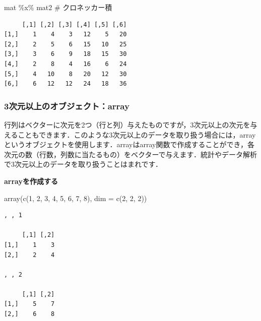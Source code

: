 \documentclass[
  letterpaper,
  DIV=11,
  numbers=noendperiod]{scrreprt}
\newenvironment{Shaded}{\begin{snugshade}}{\end{snugshade}}
\newcommand{\AttributeTok}[1]{\textcolor[rgb]{0.40,0.45,0.13}{#1}}
\newcommand{\CommentTok}[1]{\textcolor[rgb]{0.37,0.37,0.37}{#1}}
\newcommand{\DecValTok}[1]{\textcolor[rgb]{0.68,0.00,0.00}{#1}}
\newcommand{\FunctionTok}[1]{\textcolor[rgb]{0.28,0.35,0.67}{#1}}
\newcommand{\NormalTok}[1]{\textcolor[rgb]{0.00,0.23,0.31}{#1}}
\newcommand{\SpecialCharTok}[1]{\textcolor[rgb]{0.37,0.37,0.37}{#1}}
\begin{document}
\begin{Shaded}
\begin{Highlighting}[]
\NormalTok{mat }\SpecialCharTok{\%x\%}\NormalTok{ mat2 }\CommentTok{\# クロネッカー積}
\end{Highlighting}
\end{Shaded}

\begin{verbatim}
     [,1] [,2] [,3] [,4] [,5] [,6]
[1,]    1    4    3   12    5   20
[2,]    2    5    6   15   10   25
[3,]    3    6    9   18   15   30
[4,]    2    8    4   16    6   24
[5,]    4   10    8   20   12   30
[6,]    6   12   12   24   18   36
\end{verbatim}

\hypertarget{ux6b21ux5143ux4ee5ux4e0aux306eux30aaux30d6ux30b8ux30a7ux30afux30c8array}{%
\subsubsection{3次元以上のオブジェクト：array}\label{ux6b21ux5143ux4ee5ux4e0aux306eux30aaux30d6ux30b8ux30a7ux30afux30c8array}}

行列はベクターに次元を2つ（行と列）与えたものですが，3次元以上の次元を与えることもできます．このような3次元以上のデータを取り扱う場合には，arrayというオブジェクトを使用します．arrayはarray関数で作成することができ，各次元の数（行数，列数に当たるもの）をベクターで与えます．統計やデータ解析で3次元以上のデータを取り扱うことはまれです．

\textbf{arrayを作成する}

\begin{Shaded}
\begin{Highlighting}[]
\FunctionTok{array}\NormalTok{(}\FunctionTok{c}\NormalTok{(}\DecValTok{1}\NormalTok{, }\DecValTok{2}\NormalTok{, }\DecValTok{3}\NormalTok{, }\DecValTok{4}\NormalTok{, }\DecValTok{5}\NormalTok{, }\DecValTok{6}\NormalTok{, }\DecValTok{7}\NormalTok{, }\DecValTok{8}\NormalTok{), }\AttributeTok{dim =} \FunctionTok{c}\NormalTok{(}\DecValTok{2}\NormalTok{, }\DecValTok{2}\NormalTok{, }\DecValTok{2}\NormalTok{))}
\end{Highlighting}
\end{Shaded}

\begin{verbatim}
, , 1

     [,1] [,2]
[1,]    1    3
[2,]    2    4

, , 2

     [,1] [,2]
[1,]    5    7
[2,]    6    8
\end{verbatim}
\end{document}
